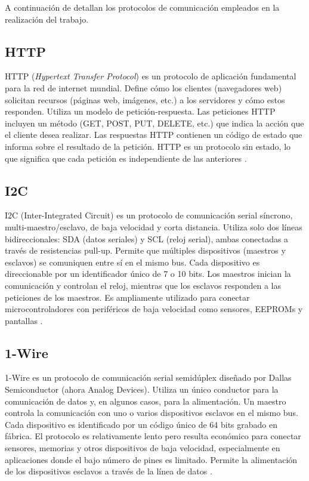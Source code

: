 A continuación de detallan los protocolos de comunicación empleados en la realización del trabajo.

\subsection{HTTP}
HTTP (\textit{Hypertext Transfer Protocol}) es un protocolo de aplicación fundamental para la red de internet mundial. Define cómo los clientes (navegadores web) solicitan recursos (páginas web, imágenes, etc.) a los servidores y cómo estos responden. Utiliza un modelo de petición-respuesta. Las peticiones HTTP incluyen un método (GET, POST, PUT, DELETE, etc.) que indica la acción que el cliente desea realizar. Las respuestas HTTP contienen un código de estado que informa sobre el resultado de la petición. HTTP es un protocolo sin estado, lo que significa que cada petición es independiente de las anteriores \cite{HTTP}.

\subsection{I2C}
I2C (Inter-Integrated Circuit) es un protocolo de comunicación serial síncrono, multi-maestro/esclavo, de baja velocidad y corta distancia. Utiliza solo dos líneas bidireccionales: SDA (datos seriales) y SCL (reloj serial), ambas conectadas a través de resistencias pull-up. Permite que múltiples dispositivos (maestros y esclavos) se comuniquen entre sí en el mismo bus. Cada dispositivo es direccionable por un identificador único de 7 o 10 bits. Los maestros inician la comunicación y controlan el reloj, mientras que los esclavos responden a las peticiones de los maestros. Es ampliamente utilizado para conectar microcontroladores con periféricos de baja velocidad como sensores, EEPROMs y pantallas \cite{I2C}.

\subsection{1-Wire}
1-Wire es un protocolo de comunicación serial semidúplex diseñado por Dallas Semiconductor (ahora Analog Devices). Utiliza un único conductor para la comunicación de datos y, en algunos casos, para la alimentación. Un maestro controla la comunicación con uno o varios dispositivos esclavos en el mismo bus. Cada dispositivo es identificado por un código único de 64 bits grabado en fábrica. El protocolo es relativamente lento pero resulta económico para conectar sensores, memorias y otros dispositivos de baja velocidad, especialmente en aplicaciones donde el bajo número de pines es limitado. Permite la alimentación de los dispositivos esclavos a través de la línea de datos \cite{1WIRE}.










